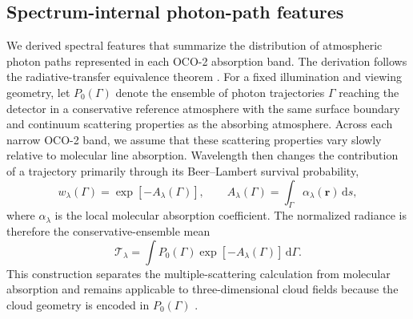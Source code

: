 %
%


\subsection{Spectrum-internal photon-path features}
\label{sec:methods_photon_path}

We derived spectral features that summarize the distribution of atmospheric
photon paths represented in each OCO-2 absorption band.  The derivation follows
the radiative-transfer equivalence theorem
\citep{irvine1964,partain2000,stephens2000}.  For a fixed illumination and
viewing geometry, let $P_0(\Gamma)$ denote the ensemble of photon trajectories
$\Gamma$ reaching the detector in a conservative reference atmosphere with the
same surface boundary and continuum scattering properties as the absorbing
atmosphere.  Across each narrow OCO-2 band, we assume that these scattering
properties vary slowly relative to molecular line absorption.  Wavelength then
changes the contribution of a trajectory primarily through its Beer--Lambert
survival probability,
\begin{equation}
  w_\lambda(\Gamma)
  = \exp[-A_\lambda(\Gamma)],
  \qquad
  A_\lambda(\Gamma)
  = \int_\Gamma \alpha_\lambda(\bm r)\,\mathrm{d}s,
  \label{eq:main_path_weight}
\end{equation}
where $\alpha_\lambda$ is the local molecular absorption coefficient.  The
normalized radiance is therefore the conservative-ensemble mean
\begin{equation}
  \mathcal T_\lambda
  = \int P_0(\Gamma)
      \exp[-A_\lambda(\Gamma)]\,\mathrm{d}\Gamma.
  \label{eq:main_equivalence}
\end{equation}
This construction separates the multiple-scattering calculation from molecular
absorption and remains applicable to three-dimensional cloud fields because the
cloud geometry is encoded in $P_0(\Gamma)$ \citep{stephens2000}.

